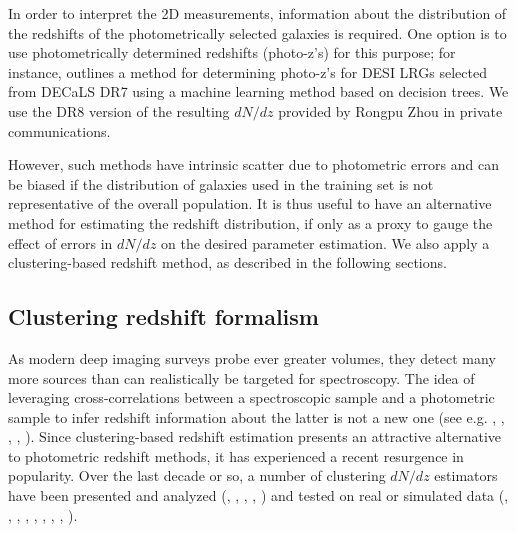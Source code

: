 In order to interpret the 2D measurements, information about the distribution of the redshifts of the photometrically selected galaxies is required. One option is to use photometrically determined redshifts (photo-z's) for this purpose; for instance, \citealt{Zhou++20} outlines a method for determining photo-z's for DESI LRGs selected from DECaLS DR7 using a machine learning method based on decision trees. We use the DR8 version of the resulting $dN/dz$ provided by Rongpu Zhou in private communications. 

However, such methods have intrinsic scatter due to photometric errors and can be biased if the distribution of galaxies used in the training set is not representative of the overall population. It is thus useful to have an alternative method for estimating the redshift distribution, if only as a proxy to gauge the effect of errors in $dN/dz$ on the desired parameter estimation. We also apply a clustering-based redshift method, as described in the following sections.

\subsection{Clustering redshift formalism}

As modern deep imaging surveys probe ever greater volumes, they detect many more sources than can realistically be targeted for spectroscopy. The idea of leveraging cross-correlations between a spectroscopic sample and a photometric sample to infer redshift information about the latter is not a new one (see e.g. \citealt{SeldnerPeebles79}, \citealt{PhillippsShanks87}, \citealt{Landy++96}, \citealt{Ho08}, \citealt{Newman08}). Since clustering-based redshift estimation presents an attractive alternative to photometric redshift methods, it has experienced a recent resurgence in popularity. Over the last decade or so, a number of clustering $dN/dz$ estimators have been presented and analyzed (\citealt{MatthewsNewman10}, \citealt{Schulz10}, \citealt{MatthewsNewman12}, \citealt{McQuinnWhite13}, \citealt{Menard13}) and tested on real or simulated data (\citealt{Schmidt13}, \citealt{Scottez++16}, \citealt{Hildebrandt++17}, \citealt{Scottez++18}, \citealt{Davis++18}, \citealt{Gatti18}, \citealt{Chiang18}, \citealt{Krolewski19}, \citealt{Kitanidis++19}). 

